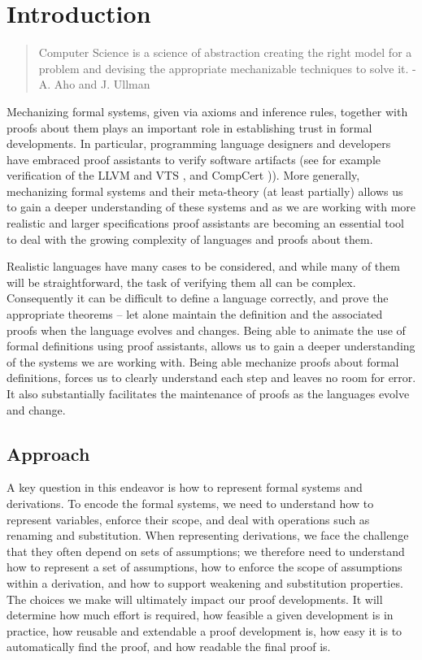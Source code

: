\chapter{Introduction}
\begin{center}
  \begin{quote}
Computer Science is a science of abstraction
creating the right model for a problem and
devising the appropriate mechanizable techniques
to solve it.
\hfill- A. Aho and J. Ullman
  \end{quote}
\end{center}

Mechanizing formal systems, given via axioms and inference rules, together with
proofs about them plays an important role in establishing trust in
formal developments. In particular, programming language designers and
developers have embraced proof assistants to verify software artifacts (see for example verification of the LLVM
\citep{ZhaoNMZ12} and VTS \citep{Appel11}, and CompCert
\citep{Leroy-Compcert-CACM})). More generally,  mechanizing formal systems
and their meta-theory  (at least partially) allows us to gain a deeper
understanding of these systems and as we are working with more
realistic and larger specifications proof assistants are becoming an essential
tool to deal with the growing complexity of languages and proofs about
them. %

Realistic languages have many cases to be considered, and
while many of them will be straightforward, the task of verifying them
all can be complex. Consequently it can be difficult to define a language
correctly, and prove the appropriate theorems -- let alone maintain
the definition and the associated proofs when the language evolves and
changes.  Being able to animate the use of formal definitions using
proof assistants, allows us to gain a deeper understanding of the
systems we are working with. Being able mechanize proofs about formal
definitions, forces us to clearly understand each step and leaves no
room for error.  It also substantially facilitates the maintenance of
proofs as the languages evolve and change.


\section{Approach}

A key question in this endeavor is how to represent formal systems and
derivations. To encode the formal systems, we need to understand how
to represent variables, enforce their scope, and deal with operations
such as renaming and substitution. When representing derivations, we
face the challenge that they often depend on sets of assumptions; we
therefore need to understand how to represent a set of assumptions,
how to enforce the scope of assumptions within a derivation, and how
to support weakening and substitution properties. The choices we make
will ultimately  impact our proof developments. It will determine
how much effort is required, how feasible a given development is in
practice, how reusable and extendable a proof development is, how easy
it is to automatically find the proof, and how readable the final proof is.

